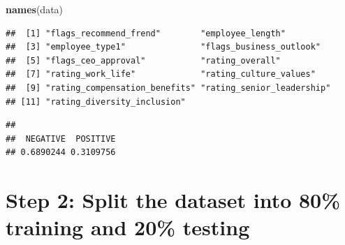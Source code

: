 \documentclass[
]{article}
\newenvironment{Shaded}{\begin{snugshade}}{\end{snugshade}}
\newcommand{\AttributeTok}[1]{\textcolor[rgb]{0.13,0.29,0.53}{#1}}
\newcommand{\CommentTok}[1]{\textcolor[rgb]{0.56,0.35,0.01}{\textit{#1}}}
\newcommand{\ConstantTok}[1]{\textcolor[rgb]{0.56,0.35,0.01}{#1}}
\newcommand{\DecValTok}[1]{\textcolor[rgb]{0.00,0.00,0.81}{#1}}
\newcommand{\FloatTok}[1]{\textcolor[rgb]{0.00,0.00,0.81}{#1}}
\newcommand{\FunctionTok}[1]{\textcolor[rgb]{0.13,0.29,0.53}{\textbf{#1}}}
\newcommand{\NormalTok}[1]{#1}
\newcommand{\OtherTok}[1]{\textcolor[rgb]{0.56,0.35,0.01}{#1}}
\newcommand{\SpecialCharTok}[1]{\textcolor[rgb]{0.81,0.36,0.00}{\textbf{#1}}}
\begin{document}
\begin{Shaded}
\begin{Highlighting}[]
\FunctionTok{names}\NormalTok{(data)}
\end{Highlighting}
\end{Shaded}

\begin{verbatim}
##  [1] "flags_recommend_frend"        "employee_length"             
##  [3] "employee_type1"               "flags_business_outlook"      
##  [5] "flags_ceo_approval"           "rating_overall"              
##  [7] "rating_work_life"             "rating_culture_values"       
##  [9] "rating_compensation_benefits" "rating_senior_leadership"    
## [11] "rating_diversity_inclusion"
\end{verbatim}

\begin{Shaded}
\end{Shaded}

\begin{verbatim}
## 
##  NEGATIVE  POSITIVE 
## 0.6890244 0.3109756
\end{verbatim}

\section{Step 2: Split the dataset into 80\% training and 20\%
testing}\label{step-2-split-the-dataset-into-80-training-and-20-testing}

\begin{Shaded}
\end{Shaded}
\end{document}
